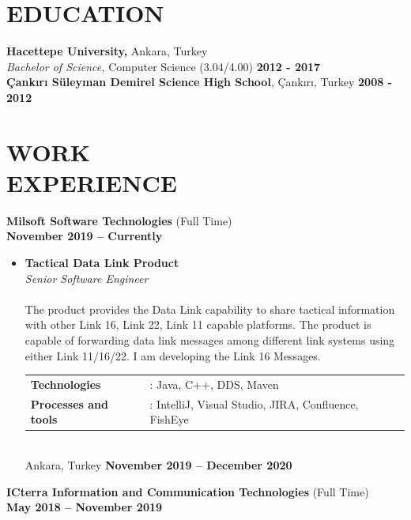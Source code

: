 \documentclass[margin]{res}
\begin{document}
\begin{resume}
\section{\mysidestyle \textbf{EDUCATION}}
\textbf{Hacettepe University,} Ankara, Turkey \\	
{\sl Bachelor of Science,} Computer Science (3.04/4.00)  \hfill {\bf 2012 - 2017} \\[0.08in] \newline
\textbf{Çankırı Süleyman Demirel Science High School}, Çankırı, Turkey \hfill {\bf 2008 - 2012} \\[0.08in]


\section{\mysidestyle \textbf{WORK\\EXPERIENCE}}
\textbf{Milsoft Software Technologies} (Full Time) \\ {\bf November 2019 –  Currently } \\
\begin{itemize}
    \item 
    \textbf{Tactical Data Link Product} \\
    \textit{Senior Software Engineer} \\
    \\
    The product provides the Data Link capability to share tactical information with other Link 16, Link 22, Link 11 capable platforms. The product is capable of forwarding data link messages among different link systems using either Link 11/16/22. I am developing the Link 16 Messages.  \\
    \begin{tabular}{@{} l l}
        \textbf{Technologies} & :   Java, C++, DDS, Maven \\ 
        \textbf{Processes and tools} & :  IntelliJ, Visual Studio, JIRA, Confluence, FishEye \\
    \end{tabular}
    \\
    Ankara, Turkey \hfill {\bf November 2019 – December 2020 }\\[0.08in] \newline
\end{itemize}
\textbf{ICterra Information and Communication Technologies} (Full Time) \\ {\bf May 2018 – November 2019 } \\
\begin{itemize}

\end{itemize}
\end{resume}
\end{document}
